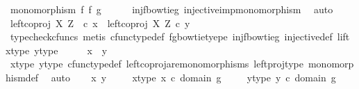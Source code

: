 \begin{isabellebody}
\ {\isachardoublequoteopen}monomorphism\ {\isacharparenleft}{\kern0pt}f\ {\isasymbowtie}\isactrlsub f\ g{\isacharparenright}{\kern0pt}{\isachardoublequoteclose}\isanewline
\ \ \ \ \isamarkupfalse%
\ inj{\isacharunderscore}{\kern0pt}f{\isacharunderscore}{\kern0pt}bowtie{\isacharunderscore}{\kern0pt}g\ injective{\isacharunderscore}{\kern0pt}imp{\isacharunderscore}{\kern0pt}monomorphism\ \isamarkupfalse%
\ auto\isanewline
\ \ \isamarkupfalse%
\ \isamarkupfalse%
\ {\isachardoublequoteopen}left{\isacharunderscore}{\kern0pt}coproj\ X\ Z\ \ {\isasymcirc}\isactrlsub c\ x\ {\isacharequal}{\kern0pt}\ left{\isacharunderscore}{\kern0pt}coproj\ X\ Z\ {\isasymcirc}\isactrlsub c\ y{\isachardoublequoteclose}\isanewline
\ \ \ \ \isamarkupfalse%
\ {\isacharparenleft}{\kern0pt}typecheck{\isacharunderscore}{\kern0pt}cfuncs{\isacharcomma}{\kern0pt}\ metis\ cfunc{\isacharunderscore}{\kern0pt}type{\isacharunderscore}{\kern0pt}def\ fg{\isacharunderscore}{\kern0pt}bowtie{\isacharunderscore}{\kern0pt}tyepe\ inj{\isacharunderscore}{\kern0pt}f{\isacharunderscore}{\kern0pt}bowtie{\isacharunderscore}{\kern0pt}g\ injective{\isacharunderscore}{\kern0pt}def\ lift\ x{\isacharunderscore}{\kern0pt}type{}\ y{\isacharunderscore}{\kern0pt}type{}{\isacharparenright}{\kern0pt}\isanewline
\ \ \isamarkupfalse%
\ \isamarkupfalse%
\ {\isachardoublequoteopen}x\ {\isacharequal}{\kern0pt}\ y{\isachardoublequoteclose}\isanewline
\ \ \ \ \isamarkupfalse%
\ x{\isacharunderscore}{\kern0pt}type{}\ y{\isacharunderscore}{\kern0pt}type{}\ cfunc{\isacharunderscore}{\kern0pt}type{\isacharunderscore}{\kern0pt}def\ left{\isacharunderscore}{\kern0pt}coproj{\isacharunderscore}{\kern0pt}are{\isacharunderscore}{\kern0pt}monomorphisms\ left{\isacharunderscore}{\kern0pt}proj{\isacharunderscore}{\kern0pt}type\ monomorphism{\isacharunderscore}{\kern0pt}def\ \isamarkupfalse%
\ auto\isanewline
{}\isamarkupfalse%
\isanewline
\ \ \isamarkupfalse%
\ x\ y\ \isanewline
\ \ \isamarkupfalse%
\ x{\isacharunderscore}{\kern0pt}type{\isacharcolon}{\kern0pt}\ {\isachardoublequoteopen}x\ {\isasymin}\isactrlsub c\ domain\ g{\isachardoublequoteclose}\ \isanewline
\ \ \isamarkupfalse%
\ y{\isacharunderscore}{\kern0pt}type{\isacharcolon}{\kern0pt}\ {\isachardoublequoteopen}y\ {\isasymin}\isactrlsub c\ domain\ g{\isachardoublequoteclose}\isanewline
\ \ \isamarkupfalse%

\end{isabellebody}
